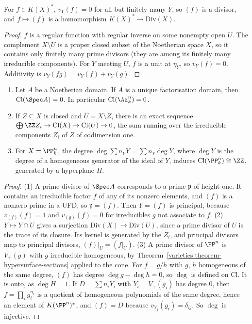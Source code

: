 \begin{lemma}\label{divisors:lemma-finite-sum}
For $f \in K(X)^*$, $v_Y(f) = 0$ for all but finitely many $Y$, so $(f)$ is a divisor, and $f \mapsto (f)$ is a homomorphism $K(X)^* \to \mathrm{Div}(X)$.
\end{lemma}

\begin{proof}
$f$ is a regular function with regular inverse on some nonempty open $U$. The complement $X \setminus U$ is a proper closed subset of the Noetherian space $X$, so
it contains only finitely many prime divisors (they are among its finitely many irreducible components). For $Y$ meeting $U$, $f$ is a unit at $\eta_Y$, so
$v_Y(f) = 0$. Additivity is $v_Y(fg) = v_Y(f) + v_Y(g)$.
\end{proof}

\begin{proposition}\label{divisors:proposition-class-group}
\begin{enumerate}
\item Let $A$ be a Noetherian domain. If $A$ is a unique factorisation domain, then $\mathrm{Cl}(\Spec A) = 0$. In particular $\mathrm{Cl}(\Aa^n_k) = 0$.
\item If $Z \subseteq X$ is closed and $U = X \setminus Z$, there is an exact sequence $\bigoplus\ZZ Z_i \to \mathrm{Cl}(X) \to \mathrm{Cl}(U) \to 0$, the sum running over the
irreducible components $Z_i$ of $Z$ of codimension one.
\item For $X = \PP^n_k$, the degree $\deg\sum n_YY = \sum n_Y\deg Y$, where $\deg Y$ is the degree of a homogeneous generator of the ideal of $Y$, induces
$\mathrm{Cl}(\PP^n_k) \cong \ZZ$, generated by a hyperplane $H$.
\end{enumerate}
\end{proposition}

\begin{proof}
(1) A prime divisor of $\Spec A$ corresponds to a prime $\mathfrak{p}$ of height one. It contains an irreducible factor $f$ of any of its nonzero elements, and $(f)$ is a
nonzero prime in a UFD, so $\mathfrak{p} = (f)$. Then $Y = (f)$ is principal, because $v_{(f)}(f) = 1$ and $v_{(g)}(f) = 0$ for irreducibles $g$ not associate to $f$.
(2) $Y \mapsto Y \cap U$ gives a surjection $\mathrm{Div}(X) \to \mathrm{Div}(U)$, since a prime divisor of $U$ is the trace of its closure. Its kernel is generated by the
$Z_i$, and principal divisors map to principal divisors, $(f)|_U = (f|_U)$. (3) A prime divisor of $\PP^n$ is $V_+(g)$ with $g$ irreducible homogeneous, by
Theorem~\ref{varieties:theorem-hypersurface-sections} applied to the cone. For $f = g/h$ with $g$, $h$ homogeneous of the same degree, $(f)$ has degree
$\deg g - \deg h = 0$, so $\deg$ is defined on $\mathrm{Cl}$. It is onto, as $\deg H = 1$. If $D = \sum n_iY_i$ with $Y_i = V_+(g_i)$ has degree $0$, then
$f = \prod_ig_i^{n_i}$ is a quotient of homogeneous polynomials of the same degree, hence an element of $K(\PP^n)^*$, and $(f) = D$ because $v_{Y_j}(g_i) = \delta_{ij}$.
So $\deg$ is injective.
\end{proof}

